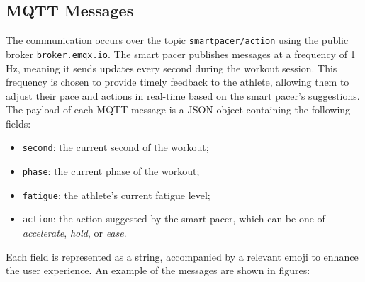 \subsection{MQTT Messages}\label{subsec:mqtt-messages}
The communication occurs over the topic \texttt{smartpacer/action} using the public broker \texttt{broker.emqx.io}. The smart pacer publishes messages at a frequency of 1 Hz, meaning it sends updates every second during the workout session. This frequency is chosen to provide timely feedback to the athlete, allowing them to adjust their pace and actions in real-time based on the smart pacer's suggestions. The payload of each MQTT message is a JSON object containing the following fields:
\begin{itemize}
  \item \texttt{second}: the current second of the workout;
  \item \texttt{phase}: the current phase of the workout;
  \item \texttt{fatigue}: the athlete's current fatigue level;
  \item \texttt{action}: the action suggested by the smart pacer, which can be one of \emph{accelerate}, \emph{hold}, or \emph{ease}.
\end{itemize}

Each field is represented as a string, accompanied by a relevant emoji to enhance the user experience.
An example of the messages are shown in figures:




  



